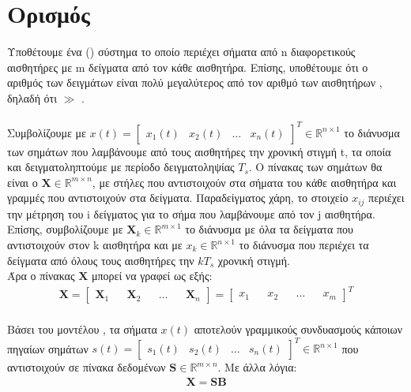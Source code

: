 \section{Ορισμός}
\justifying
Υποθέτουμε ένα  () σύστημα το οποίο περιέχει σήματα από \en n \gr διαφορετικούς αισθητήρες με \en m δείγματα από τον κάθε αισθητήρα. Επίσης, υποθέτουμε ότι ο αριθμός των δειγμάτων  είναι πολύ μεγαλύτερος από τον αριθμό των αισθητήρων , δηλαδή ότι  $\gg$ .
\\ \\
Συμβολίζουμε με $x(t) = {\begin{bmatrix} 
    x_1(t) & x_2(t) & \ldots &  x_n(t)
    \end{bmatrix}}^T \in \mathbb{R}^{n\times1} $
το διάνυσμα των σημάτων που λαμβάνουμε από τους αισθητήρες την χρονική στιγμή t, τα οποία και δειγματοληπτούμε με περίοδο δειγματοληψίας $T_s$. Ο πίνακας των σημάτων θα είναι ο $\textbf{X}\in \mathbb{R}^{m\times n}$, με στήλες που αντιστοιχούν στα σήματα του κάθε αισθητήρα και γραμμές που αντιστοιχούν στα δείγματα. Παραδείγματος χάρη, το στοιχείο $x_{ij}$ περιέχει την μέτρηση του i δείγματος για το σήμα που λαμβάνουμε από τον j αισθητήρα. Επίσης, συμβολίζουμε με $\textbf{X}_{k} \in \mathbb{R}^{m\times1}$ το διάνυσμα με όλα τα δείγματα που αντιστοιχούν στον k αισθητήρα και με $x_k \in \mathbb{R}^{n\times1}$ το διάνυσμα που περιέχει τα δείγματα από όλους τους αισθητήρες την $kT_s$ χρονική στιγμή.
\\
Άρα ο πίνακας $\textbf{X}$ μπορεί να γραφεί ως εξής:
\begin{align}\label{eq:4.1.1}
 \textbf{X} = \begin{bmatrix} 
                    \mathbf{X}_1 && \mathbf{X}_2 && \ldots && \mathbf{X}_n
                \end{bmatrix} = \begin{bmatrix} 
    x_1 && x_2 && \ldots && x_m
 \end{bmatrix}^T  
\end{align}
\\
Βάσει του μοντέλου , τα σήματα $x(t)$ αποτελούν γραμμικούς συνδυασμούς κάποιων πηγαίων σημάτων $s(t) = {\begin{bmatrix} 
    s_1(t) & s_2(t) & \ldots &  s_n(t)
    \end{bmatrix}}^T \in \mathbb{R}^{n\times1} $ 
που αντιστοιχούν σε πίνακα δεδομένων $\textbf{S} \in \mathbb{R}^{m\times n}$. Με άλλα λόγια:
\begin{align}\label{eq:4.1.2}
 \mathbf{X} = \mathbf{S}\mathbf{B} 
\end{align}
